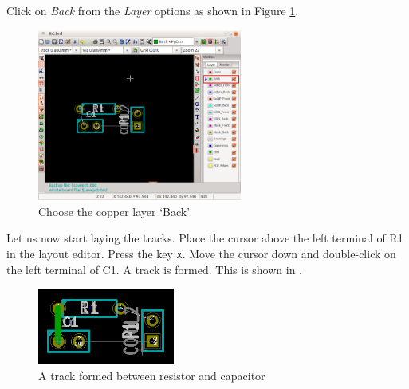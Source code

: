 Click on \textit{Back} from the \textit{Layer} options as shown in Figure \ref{layer}.
\begin{figure}
\centering
\includegraphics[width=0.6\textwidth]{figures/layer}
\caption{Choose the copper layer `Back'}
\label{layer}
\end{figure}

Let us now start laying the tracks. Place the cursor above the left terminal of R1 in the layout editor. Press the key {\tt x}.
Move the cursor down and double-click on the left terminal of C1. A track is formed. This is shown in .
\begin{figure}
\centering
\includegraphics[width=0.4\textwidth]{figures/track1}
\caption{A track formed between resistor and capacitor}
\label{track1}
\end{figure}

